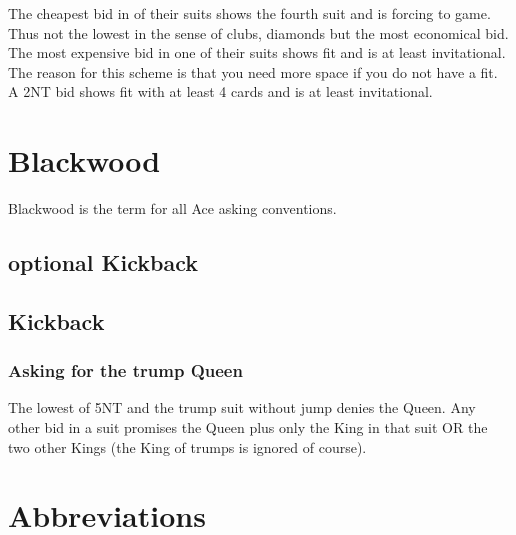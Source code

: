 \documentclass[a4paper]{article}
\begin{document}
The cheapest bid in of their suits shows the fourth suit and is forcing to
game. Thus not the lowest in the sense of clubs, diamonds but the most
economical bid. The most expensive bid in one of their suits shows fit and is
at least invitational. The reason for this scheme is that you need more space
if you do not have a fit. A 2NT bid shows fit with at least 4 cards and is at
least invitational.
\bigbreak
\section{Blackwood}

Blackwood is the term for all Ace asking conventions.
\bigbreak
\subsection{optional Kickback}

\subsection{Kickback}

\subsubsection{Asking for the trump Queen}

The lowest of 5NT and the trump suit without jump denies the Queen. Any other
bid in a suit promises the Queen plus only the King in that suit OR the two
other Kings (the King of trumps is ignored of course).
\bigbreak
\section{Abbreviations}
\end{document}
